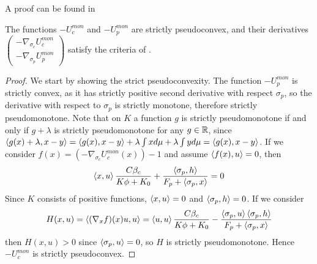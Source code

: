 A proof can be found in \citep[Proposition 2.8, p.96]{hadjisavvas2006handbook}
\begin{proposition}
  The functions $-U_c^{mon}$ and $-U_p^{mon}$ are strictly pseudoconvex, and their derivatives $\begin{pmatrix}-\nabla_{\sigma_c} U_c^{mon} \\ -\nabla_{\sigma_p} U_p^{mon}\end{pmatrix}$ satisfy the criteria of .
\end{proposition}
\begin{proof}
  We start by showing the strict pseudoconvexity. The function $-U_p^{mon}$ is strictly convex, as it has strictly positive second derivative with respect $\sigma_p$, so the derivative with respect to $\sigma_p$ is strictly monotone, therefore strictly pseudomonotone. Note that on $K$ a function $g$ is strictly pseudomonotone if and only if $g+\lambda$ is strictly pseudomonotone for any $g\in \mathbb{R}$, since $\left \langle g(x)+\lambda,x-y \right \rangle=\left \langle g(x),x-y \right \rangle+\lambda \int x d\mu + \lambda \int y d\mu=\left \langle g(x),x-y \right \rangle$. If we consider $f(x)=(-\nabla_{\sigma_c} U_c^{mon}(x))-1$ and assume $\left \langle f(x),u \right \rangle = 0$, then
  \begin{equation}
    \ip{x}{u}\frac{C \beta_c }{K\phi + K_0} + \frac{\ip{\sigma_p}{h}}{F_p + \ip{\sigma_p}{x}} = 0
  \end{equation}
  Since $K$ consists of positive functions, $\left \langle x,u \right \rangle = 0$ and $\left \langle \sigma_p,h \right \rangle = 0$. If we consider
  \begin{equation}
    H(x,u)=\ip{(\nabla_x f)(x)u}{u} = \ip{u}{u}\frac{ C \beta_c }{K\phi + K_0} - \frac{\ip{\sigma_p}{u}\ip{\sigma_p}{h}}{F_p + \ip{\sigma_p}{x}}
  \end{equation}
  then $H(x,u)>0$ since $\left \langle \sigma_p,u \right \rangle=0$, so $H$ is strictly pseudomonotone. Hence $-U_c^{mon}$ is strictly pseudoconvex.


\end{proof}
